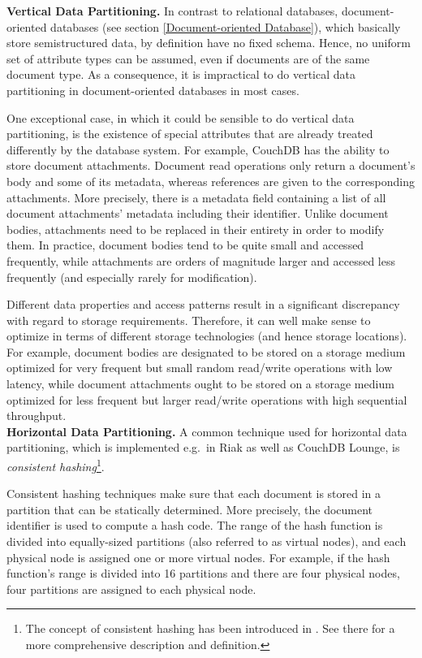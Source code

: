 \vspace{0.5em}
\noindent
{\bf Vertical Data Partitioning.} In contrast to relational databases, document-oriented databases (see section \ref{Document-oriented Database}), which basically store semistructured data, by definition have no fixed schema. Hence, no uniform set of attribute types can be assumed, even if documents are of the same document type. As a consequence, it is impractical to do vertical data partitioning in document-oriented databases in most cases.

One exceptional case, in which it could be sensible to do vertical data partitioning, is the existence of special attributes that are already treated differently by the database system. For example, CouchDB has the ability to store document attachments. Document read operations only return a document's body and some of its metadata, whereas references are given to the corresponding attachments. More precisely, there is a metadata field containing a list of all document attachments' metadata including their identifier. Unlike document bodies, attachments need to be replaced in their entirety in order to modify them. In practice, document bodies tend to be quite small and accessed frequently, while attachments are orders of magnitude larger and accessed less frequently (and especially rarely for modification).

Different data properties and access patterns result in a significant discrepancy with regard to storage requirements. Therefore, it can well make sense to optimize in terms of different storage technologies (and hence storage locations). For example, document bodies are designated to be stored on a storage medium optimized for very frequent but small random read/write operations with low latency, while document attachments ought to be stored on a storage medium optimized for less frequent but larger read/write operations with high sequential throughput.\\

\noindent
{\bf Horizontal Data Partitioning.} A common technique used for horizontal data partitioning, which is implemented e.g.\ in Riak as well as CouchDB Lounge, is \emph{consistent hashing}\footnote{The concept of consistent hashing has been introduced in \cite{KLL+97}. See there for a more comprehensive description and definition.}.

Consistent hashing techniques make sure that each document is stored in a partition that can be statically determined. More precisely, the document identifier is used to compute a hash code. The range of the hash function is divided into equally-sized partitions (also referred to as virtual nodes), and each physical node is assigned one or more virtual nodes. For example, if the hash function's range is divided into 16 partitions and there are four physical nodes, four partitions are assigned to each physical node.

